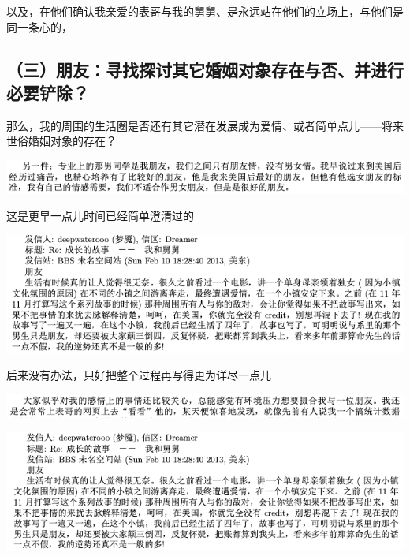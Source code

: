 \documentclass[9pt, b5paper]{article}
\begin{document}
以及，在他们确认我亲爱的表哥与我的舅舅、是永远站在他们的立场上，与他们是同一条心的，

\subsection{（三）朋友：寻找探讨其它婚姻对象存在与否、并进行必要铲除？}
\label{sec:org87e69f1}

那么，我的周围的生活圈是否还有其它潜在发展成为爱情、或者简单点儿——将来世俗婚姻对象的存在？

\begin{center}
\includegraphics[width=.9\linewidth]{./pic/backups_plans_20210424_102654.png}
\end{center}

这是更早一点儿时间已经简单澄清过的

\begin{center}
\includegraphics[width=.9\linewidth]{./pic/backups_plans_20210424_134105.png}
\end{center}

后来没有办法，只好把整个过程再写得更为详尽一点儿

\begin{center}
\includegraphics[width=.9\linewidth]{./pic/backups_plans_20210424_113449.png}
\end{center}

\begin{center}
\includegraphics[width=.9\linewidth]{./pic/backups_plans_20210424_102814.png}
\end{center}
\end{document}
